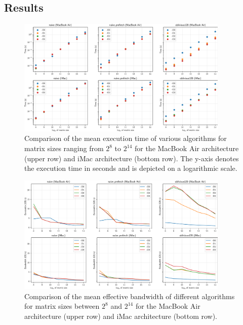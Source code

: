 \documentclass[conference]{IEEEtran}
\begin{document}
    \subsection{Results}   
    
    \begin{figure}[htbp]
        \centering
        \includegraphics[width=0.9\textwidth]{./images/time_comparision.png}
        \caption{Comparison of the mean execution time of various algorithms for matrix sizes ranging from $2^8$ to $2^{14}$ for the MacBook Air architecture (upper row) and iMac architecture (bottom row). The y-axis denotes the execution time in seconds and is depicted on a logarithmic scale.}
        \label{fig:time_comparison}  
    \end{figure}

    \begin{figure}[htbp]
        \centering
        \includegraphics[width=0.9\textwidth]{./images/bandwidth_comparision.png}
        \caption{Comparison of the mean effective bandwidth of different algorithms for matrix sizes between $2^8$ and $2^{14}$ for the MacBook Air architecture (upper row) and iMac architecture (bottom row).}
        \label{fig:bandwidth_comparison}  
    \end{figure}
\end{document}
